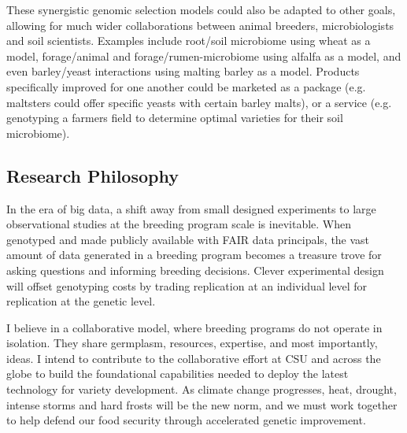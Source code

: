 \documentclass[11pt]{article}
\begin{document}

These synergistic genomic selection models could also be adapted to other goals, allowing for much wider collaborations between animal breeders, microbiologists and soil scientists. Examples include root/soil microbiome using wheat as a model, forage/animal and forage/rumen-microbiome using alfalfa as a model, and even barley/yeast interactions using malting barley as a model. Products specifically improved for one another could be marketed as a package (e.g. maltsters could offer specific yeasts with certain barley malts), or a service (e.g. genotyping a farmers field to determine optimal varieties for their soil microbiome). 

\subsection*{Research Philosophy}

In the era of big data, a shift away from small designed experiments to large observational studies at the breeding program scale is inevitable. When genotyped and made publicly available with FAIR data principals, the vast amount of data generated in a breeding program becomes a treasure trove for asking questions and informing breeding decisions. Clever experimental design will offset genotyping costs by trading replication at an individual level for replication at the genetic level.

I believe in a collaborative model, where breeding programs do not operate in isolation. They share germplasm, resources, expertise, and most importantly, ideas. I intend to contribute to the collaborative effort at CSU and across the globe to build the foundational capabilities needed to deploy the latest technology for variety development. As climate change progresses, heat, drought, intense storms and hard frosts will be the new norm, and we must work together to help defend our food security through accelerated genetic improvement. 
\end{document}
